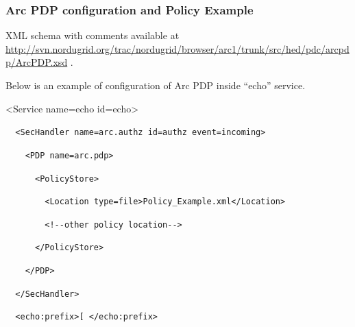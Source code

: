 \documentclass{article}
\begin{document}
\subsubsection[Arc PDP configuration and Policy Example]{Arc PDP
configuration and Policy Example}
\label{bkm:Ref204009974}{\upshape\color{black}
XML schema with comments available at
\url{http://svn.nordugrid.org/trac/nordugrid/browser/arc1/trunk/src/hed/pdc/arcpdp/ArcPDP.xsd}
.}

{\upshape\color{black}
Below is an example of configuration of Arc PDP inside
{\textquotedblleft}echo{\textquotedblright} service.}

{\ttfamily\color{black}
{\textless}Service name={\textquotedbl}echo{\textquotedbl}
id={\textquotedbl}echo{\textquotedbl}{\textgreater}}

{\upshape\color{black}
\foreignlanguage{spanish}{\texttt{\ \ }}\texttt{{\textless}SecHandler
name={\textquotedbl}arc.authz{\textquotedbl}
id={\textquotedbl}authz{\textquotedbl}
event={\textquotedbl}incoming{\textquotedbl}{\textgreater}}}

{\upshape\color{black}
\texttt{\ \ \ \ {\textless}PDP
name={\textquotedbl}arc.pdp{\textquotedbl}{\textgreater}}}

{\upshape\color{black}
\texttt{\ \ \ \ \ \ {\textless}PolicyStore{\textgreater}}}

{\upshape\color{black}
\texttt{\ \ \ \ \ \ \ \ {\textless}Location
type={\textquotedbl}file{\textquotedbl}{\textgreater}Policy\_Example.xml{\textless}/Location{\textgreater}}}

{\upshape\color{black}
\texttt{\ \ \ \ \ \ \ \ {\textless}!-{}-other policy
location-{}-{\textgreater}}}

{\upshape\color{black}
\texttt{\ \ \ \ \ \ {\textless}/PolicyStore{\textgreater}}}

{\upshape\color{black}
\texttt{\ \ \ \ {\textless}/PDP{\textgreater}}}

{\upshape\color{black}
\texttt{\ \ }\foreignlanguage{spanish}{\texttt{{\textless}/SecHandler{\textgreater}}}}

{\upshape\color{black}
\foreignlanguage{spanish}{\texttt{\ \ }}\foreignlanguage{spanish}{\texttt{{\textless}echo:prefix{\textgreater}[
{\textless}/echo:prefix{\textgreater}}}}
\end{document}
